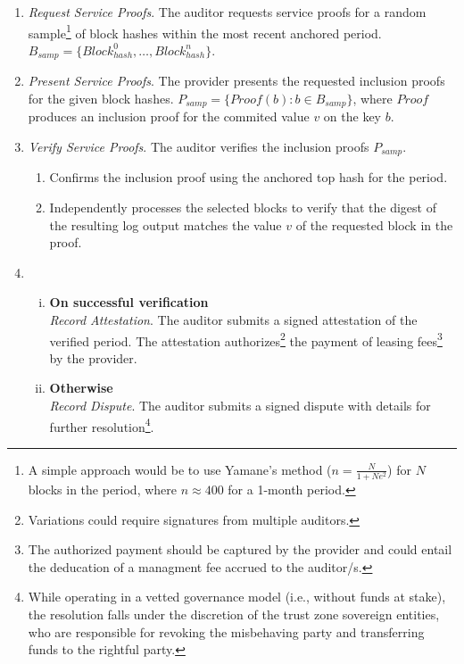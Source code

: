 \documentclass{oc}
\begin{document}
\begin{enumerate}
  \item \emph{Request Service Proofs}. The \gls{auditor} requests service proofs for a random sample\footnote{
    A simple approach would be to use Yamane's method ($n=\frac{N}{1+Ne^2}$) for $N$ blocks in the period, where $n\approx400$ for a 1-month period.
  } of block hashes within the most recent anchored period. $B_{samp}=\{Block_{hash}^0,\ldots,Block_{hash}^n\}$.
  
  \item \emph{Present Service Proofs}. The \gls{provider} presents the requested inclusion proofs for the given block hashes. $P_{samp}=\{Proof(b) : b \in B_{samp}\}$,
  where $Proof$ produces an inclusion proof for the commited value $v$ on the key $b$.
  
  \item \emph{Verify Service Proofs}. The \gls{auditor} verifies the inclusion proofs $P_{samp}$.
    \begin{enumerate}
      \item Confirms the inclusion proof using the anchored top hash for the period.
      \item Independently processes the selected blocks to verify that the digest of the resulting log output matches the value $v$ of the requested block in the proof.
    \end{enumerate}
  \item
    \begin{enumerate}[(i)]
      \item \textbf{On successful verification} \\
      \emph{Record Attestation}. The \gls{auditor} submits a signed attestation of the verified period. The attestation authorizes\footnote{
        Variations could require signatures from multiple auditors.
      } the payment of leasing fees\footnote{
        The authorized payment should be captured by the \gls{provider} and could entail the deducation of a managment fee accrued to the \gls{auditor}/s.
      } by the \gls{provider}.
      \item \textbf{Otherwise} \\
      \emph{Record Dispute}. The \gls{auditor} submits a signed dispute with details for further resolution\footnote{
        While operating in a vetted governance model (i.e., without funds at stake),
        the resolution falls under the discretion of the trust zone sovereign entities,
        who are responsible for revoking the misbehaving party and transferring funds to the rightful party.
      }.
    \end{enumerate}

\end{enumerate}
\end{document}
